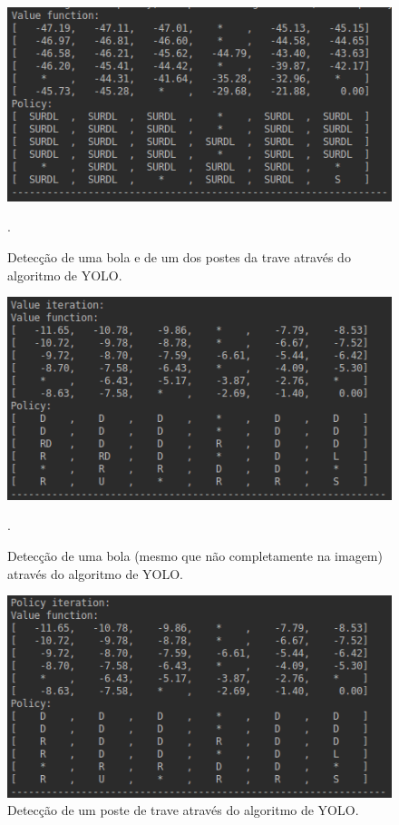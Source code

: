 \documentclass[conference]{IEEEtran}
\begin{document}
\begin{figure}[htbp]
\centering
\centerline{\includegraphics[scale=0.5]{imagens/grid2/policy_evaluation.png}}
\caption{Detecção de uma bola e de um dos postes da trave através do algoritmo de YOLO.}.
\label{grid2/policy_evaluation}
\end{figure}

\begin{figure}[htbp]
\centering
\centerline{\includegraphics[scale=0.5]{imagens/grid2/value_iteration.png}}
\caption{Detecção de uma bola (mesmo que não completamente na imagem) através do algoritmo de YOLO.}.
\label{grid2/value_iteration}
\end{figure}

\begin{figure}[htbp]
\centering
\centerline{\includegraphics[scale=0.5]{imagens/grid2/policy_iteration.png}}
\caption{Detecção de um poste de trave através do algoritmo de YOLO.}
\label{grid2/policy_iteration}
\end{figure}
\end{document}
